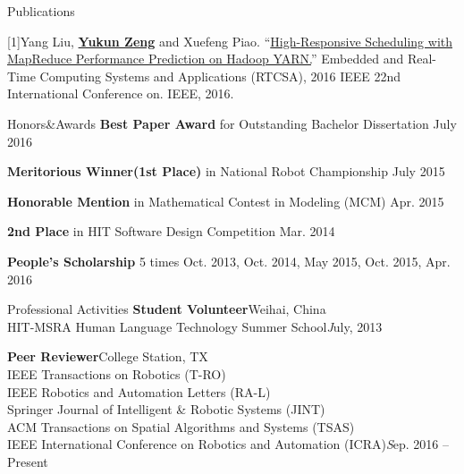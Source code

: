 \documentclass{resume} %
\begin{document}
\begin{rSection}{Publications}

{[1]Yang Liu, }\underline{\bf Yukun Zeng}{ and Xuefeng Piao. ``\href{http://ieeexplore.ieee.org/document/7579961/}{High-Responsive Scheduling with MapReduce Performance Prediction on Hadoop YARN.}'' Embedded and Real-Time Computing Systems and Applications (RTCSA), 2016 IEEE 22nd International Conference on. IEEE, 2016.
}

\end{rSection}

\begin{rSection}{Honors\&Awards}
{\bf Best Paper Award}{ for Outstanding Bachelor Dissertation} \hfill {July 2016}
\vspace*{-0.4em}

{\bf Meritorious Winner(1st Place)}{ in National Robot Championship} \hfill {July 2015}
\vspace*{-0.4em}

{\bf Honorable Mention}{ in Mathematical Contest in Modeling (MCM)} \hfill {Apr. 2015}
\vspace*{-0.4em}

{\bf 2nd Place}{ in HIT Software Design Competition} \hfill {Mar. 2014} 
\vspace*{-0.4em}

{\bf People's Scholarship} 5 times \hfill {Oct. 2013, Oct. 2014, May 2015, Oct. 2015, Apr. 2016}
\vspace*{-0.4em}

\end{rSection}

\begin{rSection}{Professional Activities}
{\bf Student Volunteer}\hfill Weihai, China\\
HIT-MSRA Human Language Technology Summer School\hfill {\emph July, 2013}
\vspace*{-0.2em}

{\bf Peer Reviewer}\hfill College Station, TX\\
IEEE Transactions on Robotics (T-RO)\\
IEEE Robotics and Automation Letters (RA-L)\\
Springer Journal of Intelligent \& Robotic Systems (JINT)\\
ACM Transactions on Spatial Algorithms and Systems (TSAS)\\
IEEE International Conference on Robotics and Automation (ICRA)\hfill {\emph Sep. 2016 -- Present}
\end{rSection}
\end{document}
